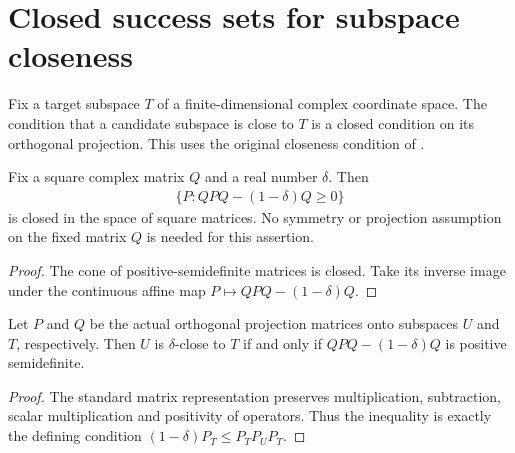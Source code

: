 \section{Closed success sets for subspace closeness}

Fix a target subspace $T$ of a finite-dimensional complex coordinate space.
The condition that a candidate subspace is close to $T$ is a closed
condition on its orthogonal projection. This uses the original closeness
condition of \cite[Definition \texttt{d:close}, lines 469--474]
{Arad2016RigorousRG}.

\begin{theorem}
    \label{thm:closed_compressed_positivity}
    \leanok
    Fix a square complex matrix $Q$ and a real number $\delta$. Then
    \begin{align}
        \bigl\{P:QPQ-(1-\delta)Q\ge0\bigr\}
    \end{align}
    is closed in the space of square matrices. No symmetry or projection
    assumption on the fixed matrix $Q$ is needed for this assertion.
\end{theorem}
\begin{proof}\leanok
    The cone of positive-semidefinite matrices is closed. Take its
    inverse image under the continuous affine map
    $P\mapsto QPQ-(1-\delta)Q$.
\end{proof}

\begin{theorem}
    \label{thm:closeness_compressed_matrix}
    \leanok
    Let $P$ and $Q$ be the actual orthogonal projection matrices onto
    subspaces $U$ and $T$, respectively. Then $U$ is $\delta$-close to $T$
    if and only if $QPQ-(1-\delta)Q$ is positive semidefinite.
\end{theorem}
\begin{proof}\leanok
    The standard matrix representation preserves multiplication,
    subtraction, scalar multiplication and positivity of operators.
    Thus the inequality is exactly the defining condition
    $(1-\delta)P_T\le P_TP_UP_T$.
\end{proof}

